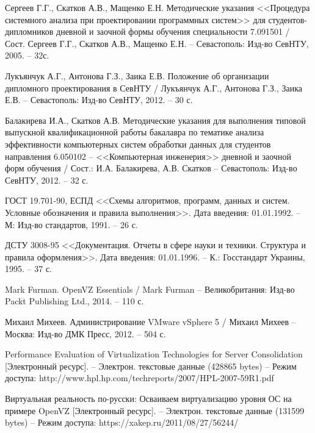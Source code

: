 \begin{thebibliography}{00}
    Сергеев Г.Г., Скатков А.В., Мащенко Е.Н.
    Методические указания <<Процедура системного анализа при проектировании программных систем>>
    для студентов-дипломников дневной и заочной формы обучения специальности 7.091501 /
    Сост. Сергеев Г.Г., Скатков А.В., Мащенко Е.Н. -- Севастополь:
    Изд-во СевНТУ, 2005. -- 32с.


 Лукъянчук А.Г., Антонова Г.З., Заика Е.В. 
    Положение об организации дипломного проектирования в СевНТУ / 
    Лукъянчук А.Г., Антонова Г.З., Заика Е.В. -- Севастополь: 
    Изд-во СевНТУ, 2012. -- 30 с.

    Балакирева И.А., Скатков А.В. 
    Методические указания для выполнения типовой выпускной 
    квалификационной работы бакалавра по тематике анализа эффективности 
    компьютерных систем обработки данных для студентов направления 
    6.050102 -- <<Компьютерная инженерия>> дневной и заочной форм обучения / 
    Сост.: И.А. Балакирева, А.В. Скатков -- Севастополь: Изд-во СевНТУ, 2012. -- 32 с.

    ГОСТ 19.701-90, ЕСПД <<Схемы алгоритмов, программ, данных и систем. 
    Условные обозначения и правила выполнения>>. 
    Дата введения: 01.01.1992. -- М: Изд-во стандартов, 1991. -- 26 с.

    ДСТУ 3008-95 <<Документация. Отчеты в сфере науки и техники. 
    Структура и правила оформления>>. 
    Дата введения: 01.01.1996. -- К.: Госстандарт Украины, 1995. -- 37 с.

    Mark Furman. OpenVZ Essentials /
    Mark Furman -- Великобритания: Изд-во Packt Publishing Ltd.,
    2014. -- 110 с.

    Михаил Михеев. Администрирование VMware vSphere 5 / 
    Михаил Михеев -- Москва: Изд-во ДМК Пресс, 
    2012. -- 504 с.
    
    Performance Evaluation of Virtualization Technologies for Server Consolidation
    [Электронный ресурс]. --
    Электрон. текстовые данные (428865 bytes) -- 
    Режим доступа: http://www.hpl.hp.com/techreports/2007/HPL-2007-59R1.pdf

    Виртуальная реальность по-русски: Осваиваем виртуализацию уровня ОС на примере OpenVZ
    [Электронный ресурс]. --
    Электрон. текстовые данные (131599 bytes) -- 
    Режим доступа: https://xakep.ru/2011/08/27/56244/


\end{thebibliography}
